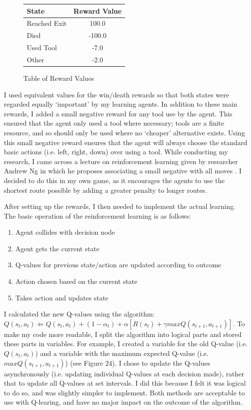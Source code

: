 \documentclass[a4paper,oneside]{report}
\begin{document}
\begin{figure}[h!]
\centering
\begin{tabular}{| l | c |}
  \hline
  State  & Reward Value \\
  \hline
  Reached Exit    &  100.0 \\
  Died   		  &  -100.0 \\
  Used Tool       &  -7.0 \\
  Other  		  &  -2.0 \\
  \hline
\end{tabular}
\caption{Table of Reward Values}
\end{figure}

I used equivalent values for the win/death rewards so that both states were regarded equally `important' by my learning agents. In addition to these main rewards, I added a small negative reward for any tool use by the agent. This ensured that the agent only used a tool where necessary; tools are a finite resource, and so should only be used where no `cheaper' alternative exists. Using this small negative reward ensures that the agent will always choose the standard basic actions (i.e. left, right, down) over using a tool. While conducting my research, I came across a lecture on reinforcement learning given by researcher Andrew Ng in which he proposes associating a small negative with all moves \cite{Ng:uq}. I decided to do this in my own game, as it encourages the agents to use the shortest route possible by adding a greater penalty to longer routes.

After setting up the rewards, I then needed to implement the actual learning. The basic operation of the reinforcement learning is as follows:

\begin{enumerate}
	\item Agent collides with decision node
	\item Agent gets the current state
	\item Q-values for previous state/action are updated according to outcome
	\item Action chosen based on the current state
	\item Takes action and updates state
\end{enumerate}

I calculated the new Q-values using the algorithm: $Q(s_t,a_t) \Leftarrow Q(s_t, a_t) + (1 -\alpha_t) + \alpha[R(s_t) + \gamma max Q(s_{t+1}, a_{t+1})]$. To make my code more readable, I split the algorithm into logical parts and stored these parts in variables. For example, I created a variable for the old Q-value (i.e. $Q(s_t, a_t)$) and a variable with the maximum expected Q-value (i.e. $max Q(s_{t+1}, a_{t+1})$) (see Figure 24). I chose to update the Q-values asynchronously (i.e. updating individual Q-values at each decision made), rather that to update all Q-values at set intervals. I did this because I felt it was logical to do so, and was slightly simpler to implement. Both methods are acceptable to use with Q-learing, and have no major impact on the outcome of the algorithm.
\end{document}
